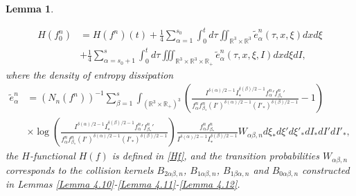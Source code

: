 \documentclass[reqno,11pt]{amsart}
\newtheorem{lemma}{Lemma}[section]
\numberwithin{equation}{section}
\def\R{\mathbb{R}}
\begin{document}
\begin{lemma}
\begin{enumerate}
{		\begin{equation}\label{entro}
			\begin{aligned}
				H(f^n_{0}) & = H(f^n)(t)+ \tfrac{1}{4}\sum \limits_{\alpha =1}^{s_0} \int_{0}^{t} d \tau \iint_{ \R^3 \times \R^3 } \tilde{e}_\alpha^n(
\tau,x,\xi ) dxd\xi\\
				& +\tfrac{1}{4}\sum \limits_{\alpha =s_0+1}^{s}\int_{0}^{t} d \tau \iiint_{ \R^3 \times \R^3 \times \R_+} \tilde{e}_\alpha^n(\tau,x,\xi ,I) dxd\xi dI ,
			\end{aligned}
		\end{equation}
where the density of entropy dissipation
\begin{equation}\label{e na}
	\begin{aligned}
	\tilde{e}_\alpha^n &= (N_n (f^n))^{-1} \sum \limits_{\beta =1}^s \int_{(\R^3\times \R_+)^3} (\tfrac{I^{\delta(\alpha)/2-1} I_* ^{\delta(\beta)/2-1}{f_\alpha^n}' {f_{\beta_*}^n}'  } {f^n_\alpha f^n_{\beta_* } (I')^{\delta(\alpha)/2-1} (I'_* )^{\delta(\beta)/2-1}} - 1)\\
&\times \log (\tfrac{I^{\delta(\alpha)/2-1} I_* ^{\delta(\beta)/2-1} {f_\alpha^n}' {f_{\beta_*}^n}' }{f^n_\alpha f^n_{\beta_* } (I')^{\delta(\alpha)/2-1} (I'_* )^{\delta(\beta)/2-1} } ) \tfrac{f^n_\alpha f^n_{\beta_* } }{I^{\delta(\alpha)/2-1} I_* ^{\delta(\beta)/2-1} }W_{\alpha\beta,n }d\xi_* d\xi'd\xi'_* dI_* dI' dI'_*,
	\end{aligned}
\end{equation}
the $H$-functional $H(f)$ is defined in \eqref{Hf}, and the transition probabilities $W_{\alpha \beta ,n}$ corresponds to the collision kernels $B_{2 \alpha \beta ,n}$, $B_{1 \alpha \beta, n}$, $B_{1 \beta \alpha, n}$ and $B_{0 \alpha \beta, n}$ constructed in Lemmas \ref{Lemma 4.10}-\ref{Lemma 4.11}-\ref{Lemma 4.12}. }\label{2 of Lemma 4.17}


\end{enumerate}
\end{lemma}
\end{document}
